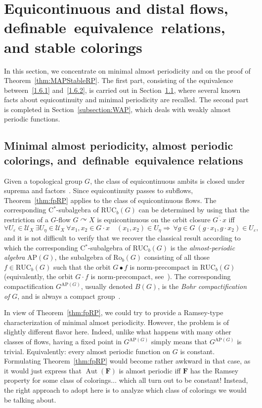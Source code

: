 \documentclass[11pt]{article}
\theoremstyle{definition}
\numberwithin{equation}{section}
\numberwithin{figure}{section}
\numberwithin{table}{section}
\newcommand*{\mF}{\mathbf{F}}
\DeclareMathOperator{\Aut}{Aut}
\newcommand{\actson}{\curvearrowright}
\newcommand{\RUCB}{\mathrm{RUC}_{b}}
\newcommand{\ROB}{\mathrm{Ro}_{b}}
\newcommand{\AP}{\mathrm{AP}}
\let\oldexists\exists
\renewcommand*{\exists}{\mathrel{\oldexists}}
\let\oldforall\forall
\renewcommand*{\forall}{\mathrel{\oldforall}}
\begin{document}
\section{Equicontinuous and distal flows, definable~equivalence~relations, and stable colorings}
\label{section:map}

In this section, we concentrate on minimal almost periodicity and on the proof of Theorem~\ref{thm:MAPStableRP}. The first part, consisting of the equivalence between~\eqref{1.6.1} and~\eqref{1.6.2}, is carried out in Section~\ref{subsection:mapdefeqrel}, where several known facts about equicontinuity and minimal periodicity are recalled. The second part is completed in Section~\ref{subsection:WAP}, which deals with weakly almost periodic functions.

\subsection{Minimal almost periodicity, almost periodic colorings, and~definable~equivalence relations}
\label{subsection:mapdefeqrel}

Given a topological group $G$, the class of equicontinuous ambits is closed under suprema and factors~\cite[Chapter~IV, Section~2.27]{dV}. Since equicontinuity passes to subflows, Theorem~\ref{thm:fpRP} applies to the class of equicontinuous flows. The corresponding C$^{*}$-subalgebra of $\RUCB(G)$ can be determined by using that the restriction of a $G$-flow $G\actson X$ is equicontinuous on the orbit closure $\overline{G\cdot x}$ iff
\[
\forall U_{\varepsilon}\in \mathcal U_{X} \ \exists U_{\eta}\in \mathcal U_{X} \ \forall x_{1},x_{2}\in G\cdot x \quad (x_{1},x_{2})\in U_{\eta} \Rightarrow\, \forall g\in G \ (g\cdot x_{1}, g\cdot x_{2})\in U_{\varepsilon},
\]
and it is not difficult to verify that we recover the classical result according to which the corresponding C$^{*}$-subalgebra of $\RUCB(G)$ is the \emph{almost-periodic algebra} $\AP(G)$, the subalgebra of $\ROB(G)$ consisting of all those $f\in \RUCB(G)$ such that the orbit $G\bullet f$ is norm-precompact in $\RUCB(G)$ (equivalently, the orbit $G\cdot f$ is norm-precompact, see~\cite[Chapter~IV, Sections~5.30 and~6.15]{dV}). The corresponding compactification $G^{\AP(G)}$, usually denoted $B(G)$, is the \emph{Bohr compactification of} $G$, and is always a compact group~\cite[Appendix~(D.12)]{dV}.

In view of Theorem~\ref{thm:fpRP}, we could try to provide a Ramsey-type characterization of minimal almost periodicity. However, the problem is of slightly different flavor here. Indeed, unlike what happens with many other classes of flows, having a fixed point in $G^{\AP(G)}$ simply means that $G^{\AP(G)}$ is trivial. Equivalently: every almost periodic function on $G$ is constant. Formulating Theorem~\ref{thm:fpRP} would become rather awkward in that case, as it would just express that $\Aut(\mF)$ is almost periodic iff $\mF$ has the Ramsey property for some class of colorings$\ldots$ which all turn out to be constant! Instead, the right approach to adopt here is to analyze which class of colorings we would be talking about.
\end{document}
